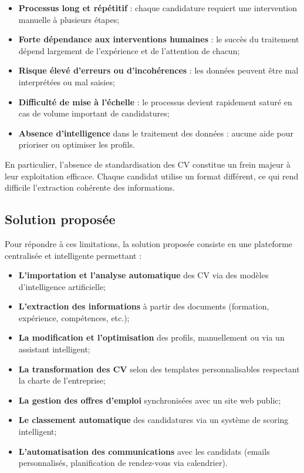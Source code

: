 \begin{itemize}
    \item \textbf{Processus long et répétitif} : chaque candidature requiert une intervention manuelle à plusieurs étapes;
    
    \item \textbf{Forte dépendance aux interventions humaines} : le succès du traitement dépend largement de l'expérience et de l'attention de chacun;
    
    \item \textbf{Risque élevé d'erreurs ou d'incohérences} : les données peuvent être mal interprétées ou mal saisies;
    
    \item \textbf{Difficulté de mise à l'échelle} : le processus devient rapidement saturé en cas de volume important de candidatures;
    
    \item \textbf{Absence d'intelligence} dans le traitement des données : aucune aide pour prioriser ou optimiser les profils.
\end{itemize}

En particulier, l'absence de standardisation des CV constitue un frein majeur à leur exploitation efficace. Chaque candidat utilise un format différent, ce qui rend difficile l'extraction cohérente des informations.


\subsection{Solution proposée}
\label{subsec:solution-proposee}

Pour répondre à ces limitations, la solution proposée consiste en une plateforme centralisée et intelligente permettant :

\begin{itemize}
    \item \textbf{L'importation et l'analyse automatique} des CV via des modèles d'intelligence artificielle;
    
    \item \textbf{L'extraction des informations} à partir des documents (formation, expérience, compétences, etc.);
    
    \item \textbf{La modification et l'optimisation} des profils, manuellement ou via un assistant intelligent;
    
    \item \textbf{La transformation des CV} selon des templates personnalisables respectant la charte de l'entreprise;
    
    \item \textbf{La gestion des offres d'emploi} synchronisées avec un site web public;
    
    \item \textbf{Le classement automatique} des candidatures via un système de scoring intelligent;
    
    \item \textbf{L'automatisation des communications} avec les candidats (emails personnalisés, planification de rendez-vous via calendrier).
\end{itemize}

